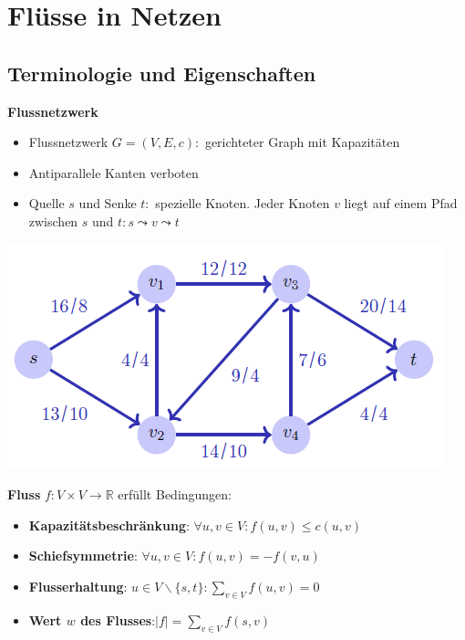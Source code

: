 \section{Flüsse in Netzen}
\vspace{-4pt}
\begin{sectionbox}
\subsection{Terminologie und Eigenschaften}\medskip
\textbf{Flussnetzwerk}\par
\begin{itemize}
    \item Flussnetzwerk $G=(V, E, c):$ gerichteter Graph mit Kapazitäten
    \item Antiparallele Kanten verboten
    \item Quelle $s$ und Senke $t:$ spezielle Knoten. Jeder Knoten $v$ liegt auf einem Pfad zwischen $s$ und $t: s \leadsto v \leadsto t$
\end{itemize}\par\smallskip
\begin{center}
    \includegraphics[width = 0.9\columnwidth]{../img/flussNet.png}
\end{center}

\textbf{Fluss}  $f: V \times V \rightarrow \mathbb{R}$ erfüllt Bedingungen:\par
\begin{itemize}
    \item \textbf{Kapazitätsbeschränkung}: $\forall u, v \in V: f(u, v) \leq c(u, v)$
    \item \textbf{Schiefsymmetrie}: $\forall u, v \in V: f(u, v)=-f(v, u)$
    \item \textbf{Flusserhaltung}: $u \in V \backslash\{s, t\}: \sum_{v \in V} f(u, v)=0$
    \item \textbf{Wert $w$ des Flusses}:$|f|=\sum_{v \in V} f(s, v)$
\end{itemize}\par\smallskip
\end{sectionbox}
